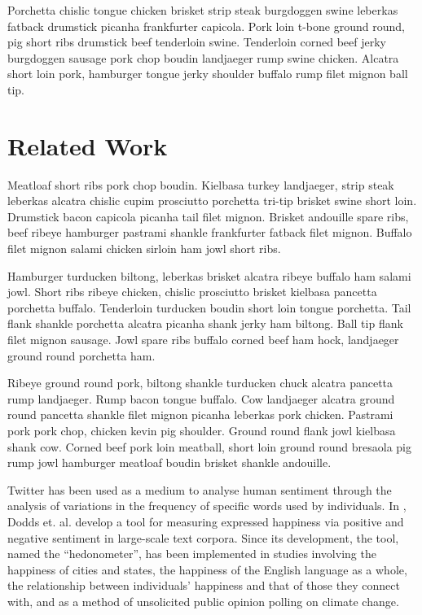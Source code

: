 \documentclass[9pt,twocolumn,twoside,lineno]{pnas-new}
\begin{document}
Porchetta chislic tongue chicken brisket strip steak burgdoggen swine leberkas fatback drumstick picanha frankfurter capicola. Pork loin t-bone ground round, pig short ribs drumstick beef tenderloin swine. Tenderloin corned beef jerky burgdoggen sausage pork chop boudin landjaeger rump swine chicken. Alcatra short loin pork, hamburger tongue jerky shoulder buffalo rump filet mignon ball tip.

\section*{Related Work}
Meatloaf short ribs pork chop boudin. Kielbasa turkey landjaeger, strip steak leberkas alcatra chislic cupim prosciutto porchetta tri-tip brisket swine short loin. Drumstick bacon capicola picanha tail filet mignon. Brisket andouille spare ribs, beef ribeye hamburger pastrami shankle frankfurter fatback filet mignon. Buffalo filet mignon salami chicken sirloin ham jowl short ribs.

Hamburger turducken biltong, leberkas brisket alcatra ribeye buffalo ham salami jowl. Short ribs ribeye chicken, chislic prosciutto brisket kielbasa pancetta porchetta buffalo. Tenderloin turducken boudin short loin tongue porchetta. Tail flank shankle porchetta alcatra picanha shank jerky ham biltong. Ball tip flank filet mignon sausage. Jowl spare ribs buffalo corned beef ham hock, landjaeger ground round porchetta ham.

Ribeye ground round pork, biltong shankle turducken chuck alcatra pancetta rump landjaeger. Rump bacon tongue buffalo. Cow landjaeger alcatra ground round pancetta shankle filet mignon picanha leberkas pork chicken. Pastrami pork pork chop, chicken kevin pig shoulder. Ground round flank jowl kielbasa shank cow. Corned beef pork loin meatball, short loin ground round bresaola pig rump jowl hamburger meatloaf boudin brisket shankle andouille.

Twitter has been used as a medium to analyse human sentiment through the analysis of variations in the frequency of specific words used by individuals. In \cite{Dodds2011}, Dodds et. al. develop a tool for measuring expressed happiness via positive and negative sentiment in large-scale text corpora. Since its development, the tool, named the ``hedonometer”, has been implemented in studies involving the happiness of cities and states, the happiness of the English language as a whole, the relationship between individuals' happiness and that of those they connect with, and as a method of unsolicited public opinion polling on climate change. %
\end{document}
